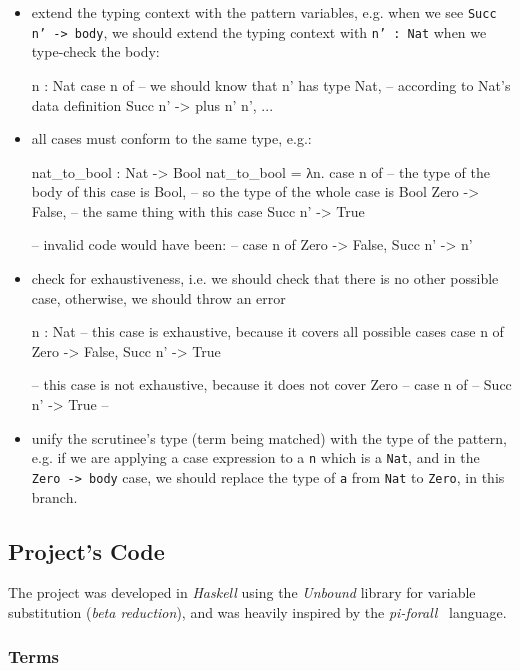 \documentclass[12pt]{article}
\theoremstyle{definition}
\newcommand{\code}[1]{\texttt{#1}}
\begin{document}
\begin{itemize}
       \item extend the typing context with the pattern variables, e.g. when we see \code{Succ n' -> body}, we should extend the typing context with \code{n' : Nat} when we type-check the body:
\begin{piforall}
n : Nat
case n of {
  -- we should know that n' has type Nat,
  --  according to Nat's data definition
  Succ n' -> plus n' n',
  ...
}
\end{piforall}
       \item all cases must conform to the same type, e.g.:
\begin{piforall}
nat_to_bool : Nat -> Bool
nat_to_bool = λn. case n of {
  -- the type of the body of this case is Bool,
  -- so the type of the whole case is Bool
  Zero -> False,
  -- the same thing with this case
  Succ n' -> True
}

-- invalid code would have been:
-- case n of { Zero -> False, Succ n' -> n' }
\end{piforall}
       \item check for exhaustiveness, i.e. we should check that there is no other possible case, otherwise, we should throw an error
\begin{piforall}
n : Nat
-- this case is exhaustive, because it covers all possible cases
case n of {
  Zero -> False,
  Succ n' -> True
}

-- this case is not exhaustive, because it does not cover Zero
--   case n of {
--     Succ n' -> True
--   }
\end{piforall}
       \item unify the scrutinee's type (term being matched) with the type of the pattern, e.g. if we are applying a case expression to a \code{n} which is a \code{Nat}, and in the \code{Zero -> body} case, we should replace the type of \code{a} from \code{Nat} to \code{Zero}, in this branch.
\end{itemize}



\subsection{Project's Code}

The project was developed in \emph{Haskell} using the \emph{Unbound} library for variable substitution (\emph{beta reduction}), and was heavily inspired by the \emph{pi-forall}~\cite{oplss} language.
\subsubsection{Terms}
\end{document}
